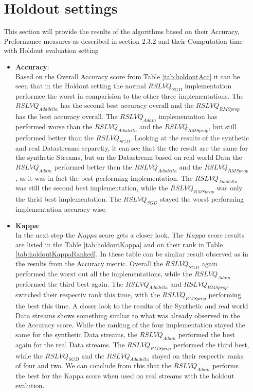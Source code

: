 \documentclass[12pt,oneside,a4paper,parskip]{scrbook}
\begin{document}
\section{Holdout settings}
This section will provide the results of the algorithms based on their Accuracy, Preformance measures as described in section 2.3.2
and their Computation time with Holdout evaluation setting

\begin{itemize}
  \item \textbf{Accuracy}: \\
        Based on the Overall Accuracy score from Table \ref{tab:holdoutAcc} it can be seen that in the Holdout setting the
        normal $RSLVQ_\textit{SGD}$ implementation performce the worst in comparision to the other three implementations.
        The $RSLVQ_\textit{Adadelta}$ has the second best accuracy overall and the $RSLVQ_\textit{RMSprop}$ has the best 
        accuracy overall. The $RSLVQ_\textit{Adam}$ implementation has performed worse than the $RSLVQ_\textit{Adadelta}$
        and the $RSLVQ_\textit{RMSprop}$, but still performed better than the $RSLVQ_\textit{SGD}$.
        Looking at the results of the synthetic and real Datastreams separetly, it can see that the the result are the same
        for the synthetic Streams, but on the Datastream based on real world Data the $RSLVQ_\textit{Adam}$ performed better then
        the $RSLVQ_\textit{Adadelta}$ and the $RSLVQ_\textit{RMSprop}$, as it was in fact the best performing implementation.
        The $RSLVQ_\textit{Adadelta}$ was still the second best implementation, while the $RSLVQ_\textit{RMSprop}$ was only the thrid 
        best implementation. The $RSLVQ_\textit{SGD}$ stayed the worst performing implementation accuracy wise.

  \item \textbf{Kappa}: \\
        In the next step the $Kappa$ score gets a closer look. The $Kappa$ score results are listed in the 
        Table \ref{tab:holdoutKappa} and on their rank in Table \ref{tab:holdoutKappaRanked}.
        In these table can be simliar result observed as in the results from the Accuracy metric.
        Overall the $RSLVQ_\textit{SGD}$ again performed the worst out all the implementations, while the $RSLVQ_\textit{Adam}$
        performed the third best again. The $RSLVQ_\textit{Adadelta}$ and $RSLVQ_\textit{RMSprop}$ switched their respectiv rank this 
        time, with the $RSLVQ_\textit{RMSprop}$ performing  the best this time.
        A closer look to the results of the Synthetic and real world Data streams shows something
        simliar to what was already observed in the the Accuracy score.
        While the ranking of the four implementation stayed the same for the synthetic Data streams, the $RSLVQ_\textit{Adam}$ performed 
        the best again for the real Data streams. The $RSLVQ_\textit{RMSprop}$ performed the third best, while the $RSLVQ_\textit{SGD}$ and
        the $RSLVQ_\textit{Adadelta}$ stayed on their respectiv ranks of four and two.
        We can conclude from this that the $RSLVQ_\textit{Adam}$ performs the best for the Kappa score when used on real streams with the holdout
        evalution.


\end{itemize}
\end{document}
